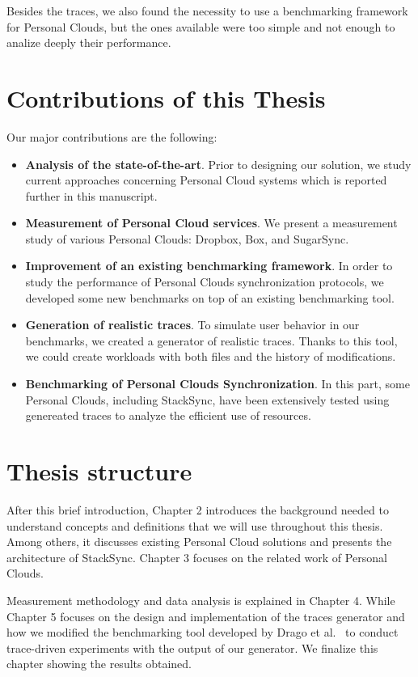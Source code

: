 Besides the traces, we also found the necessity to use a benchmarking framework for Personal Clouds, but the
ones available were too simple and not enough to analize deeply their performance.

\section{Contributions of this Thesis}
Our major contributions are the following:

\begin{itemize}
	\item \textbf{Analysis of the state-of-the-art}. Prior to designing our solution, we study current approaches concerning Personal Cloud systems which is reported further in this manuscript.
	\item \textbf{Measurement of Personal Cloud services}. We present a measurement study of various Personal Clouds: Dropbox, Box, and SugarSync.
	\item \textbf{Improvement of an existing benchmarking framework}. In order to study the performance of Personal
	Clouds synchronization protocols, we developed some new benchmarks on top of an existing benchmarking tool.
	\item \textbf{Generation of realistic traces}. To simulate user behavior in our benchmarks, we created a
	generator of realistic traces. Thanks to this tool, we could create workloads with both files and the history of modifications.
	\item \textbf{Benchmarking of Personal Clouds Synchronization}. In this part, some Personal Clouds, including StackSync, have
	been extensively tested using genereated traces to analyze the efficient use of resources.	
\end{itemize}

\section{Thesis structure}
After this brief introduction, Chapter 2 introduces the background needed to understand concepts
and definitions that we will use throughout this thesis. Among others, it discusses existing Personal Cloud solutions and presents the architecture of StackSync. Chapter 3 focuses on the related work of Personal Clouds.

Measurement methodology and data analysis is explained in Chapter 4. While Chapter 5 focuses on the design and implementation of the traces generator and how we modified the benchmarking tool developed by Drago et al.~\cite{drago2013benchmarking} to conduct trace-driven experiments with the output of our generator. We finalize this chapter showing the results obtained.

